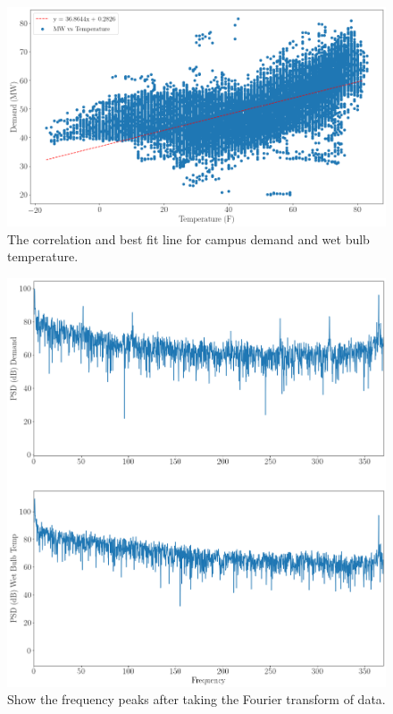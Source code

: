 \begin{figure}[H]
  \centering
  \includegraphics[width=\textwidth]{demandtempcorr}
  \caption{The correlation and best fit line for campus demand and wet bulb
  temperature.}
  \label{fig:tempcorrelation}
\end{figure}

\begin{figure}[H]
  \centering
  \includegraphics[width=\textwidth]{demandtempfreq}
  \caption{Show the frequency peaks after taking the Fourier transform of data.}
  \label{fig:demandfreq}
\end{figure}

